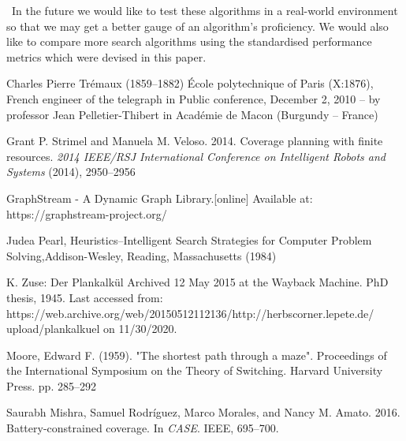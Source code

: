 \documentclass[conference]{IEEEtran}
\begin{document}
\
In the future we would like to test these algorithms in a real-world environment so that we may get a better gauge of an algorithm's proficiency. We would also like to compare more search algorithms using the standardised performance metrics which were devised in this paper.






%
%
%
\begin{thebibliography}{1}

Charles Pierre Trémaux (1859–1882) École polytechnique of Paris (X:1876), French engineer of the telegraph
in Public conference, December 2, 2010 – by professor Jean Pelletier-Thibert in Académie de Macon (Burgundy – France)

Grant P. Strimel and Manuela M. Veloso. 2014. Coverage planning with finite
resources. \textit{2014 IEEE/RSJ International Conference on Intelligent Robots and Systems}
(2014), 2950–2956

GraphStream - A Dynamic Graph Library.[online] Available at: https://graphstream-project.org/

Judea Pearl, Heuristics--Intelligent Search Strategies for Computer Problem Solving,Addison-Wesley, Reading, Massachusetts (1984)

K. Zuse: Der Plankalkül Archived 12 May 2015 at the Wayback Machine. PhD thesis, 1945. Last accessed from:
https://web.archive.org/web/20150512112136/http://herbscorner.lepete.de/ upload/plankalkuel on 11/30/2020.

Moore, Edward F. (1959). "The shortest path through a maze". Proceedings of the International Symposium on the Theory of Switching. Harvard University Press. pp. 285–292
 
Saurabh Mishra, Samuel Rodríguez, Marco Morales, and Nancy M. Amato. 2016. Battery-constrained coverage. In \textit{CASE}. IEEE, 695–700.

\end{thebibliography}




\end{document}
